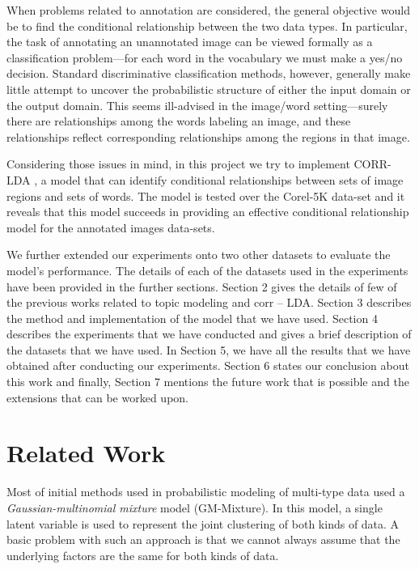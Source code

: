 \documentclass[journal]{IEEEtran}
\begin{document}
When problems related to annotation are considered, the general objective would be to find the conditional relationship between the two data types. In particular, the task of annotating an unannotated image can be viewed formally as a classiﬁcation problem—for each word in the vocabulary we must make a yes/no decision. Standard discriminative classiﬁcation methods, however, generally make little attempt to uncover the probabilistic structure of either the input domain or the output domain. This seems ill-advised in the image/word setting—surely there are relationships among the words labeling an image, and these relationships reﬂect corresponding relationships among the regions in that image. 

Considering those issues in mind, in this project we try to implement CORR-LDA \cite{corr-lda}, a model that can identify conditional relationships between sets of image regions and sets of words. The model is tested over the Corel-5K data-set and it reveals that this model succeeds in providing an effective conditional relationship model for the annotated images data-sets.

We further extended our experiments onto two other datasets to evaluate the model’s performance. The details of each of the datasets used in the experiments have been provided in the further sections. Section 2 gives the details of few of the previous works related to topic modeling and corr – LDA. Section 3 describes the method and implementation of the model that we have used. Section 4 describes the experiments that we have conducted and gives a brief description of the datasets that we have used. In Section 5, we have all the results that we have obtained after conducting our experiments. Section 6 states our conclusion about this work and finally, Section 7 mentions the future work that is possible and the extensions that can be worked upon.
 
\section{Related Work}
Most of initial methods used in probabilistic modeling of multi-type data used a \textit{Gaussian-multinomial mixture} model \cite{barnard2003matching,shi2000normalized} (GM-Mixture). In this model, a single latent variable is used to represent the joint clustering of both kinds of data. A basic problem with such an approach is that we cannot always assume that the underlying factors are the same for both kinds of data. 
\end{document}
